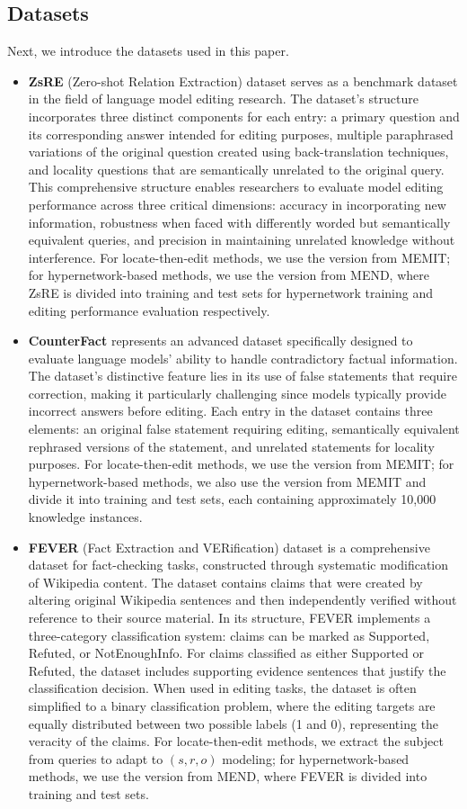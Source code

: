 \subsection{Datasets}
Next, we introduce the datasets used in this paper.
\begin{itemize}
    \item \textbf{ZsRE} (Zero-shot Relation Extraction) \cite{zsre} dataset serves as a benchmark dataset in the field of language model editing research. The dataset's structure incorporates three distinct components for each entry: a primary question and its corresponding answer intended for editing purposes, multiple paraphrased variations of the original question created using back-translation techniques, and locality questions that are semantically unrelated to the original query. This comprehensive structure enables researchers to evaluate model editing performance across three critical dimensions: accuracy in incorporating new information, robustness when faced with differently worded but semantically equivalent queries, and precision in maintaining unrelated knowledge without interference. For locate-then-edit methods, we use the version from MEMIT; for hypernetwork-based methods, we use the version from MEND, where ZsRE is divided into training and test sets for hypernetwork training and editing performance evaluation respectively.
    \item \textbf{CounterFact} \cite{rome} represents an advanced dataset specifically designed to evaluate language models'  ability to handle contradictory factual information. The dataset's distinctive feature lies in its use of false statements that require correction, making it particularly challenging since models typically provide incorrect answers before editing. Each entry in the dataset contains three elements: an original false statement requiring editing, semantically equivalent rephrased versions of the statement, and unrelated statements for locality purposes. For locate-then-edit methods, we use the version from MEMIT; for hypernetwork-based methods, we also use the version from MEMIT and divide it into training and test sets, each containing approximately 10,000 knowledge instances.
    \item \textbf{FEVER} (Fact Extraction and VERification) \cite{fever} dataset is a comprehensive dataset for fact-checking tasks, constructed through systematic modification of Wikipedia content. The dataset contains claims that were created by altering original Wikipedia sentences and then independently verified without reference to their source material. In its structure, FEVER implements a three-category classification system: claims can be marked as Supported, Refuted, or NotEnoughInfo. For claims classified as either Supported or Refuted, the dataset includes supporting evidence sentences that justify the classification decision. When used in editing tasks, the dataset is often simplified to a binary classification problem, where the editing targets are equally distributed between two possible labels (1 and 0), representing the veracity of the claims. For locate-then-edit methods, we extract the subject from queries to adapt to $(s,r,o)$ modeling; for hypernetwork-based methods, we use the version from MEND, where FEVER is divided into training and test sets.

\end{itemize}
